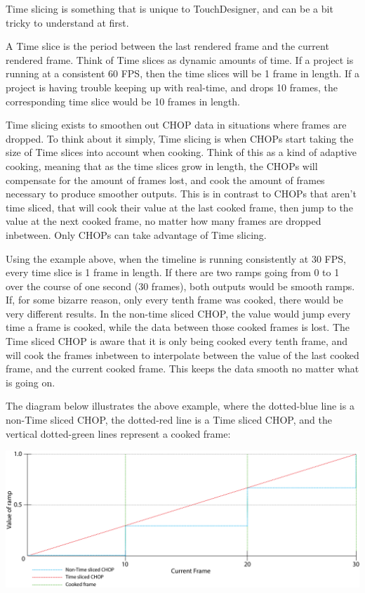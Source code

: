 \begin{fullwidth}

Time slicing is something that is unique to TouchDesigner, and can be a bit tricky to understand at first. 

A Time slice is the period between the last rendered frame and the current rendered frame. Think of Time slices as dynamic amounts of time. If a project is running at a consistent 60 FPS, then the time slices will be 1 frame in length. If a project is having trouble keeping up with real-time, and drops 10 frames, the corresponding time slice would be 10 frames in length.

Time slicing exists to smoothen out CHOP data in situations where frames are dropped. To think about it simply, Time slicing is when CHOPs start taking the size of Time slices into account when cooking. Think of this as a kind of adaptive cooking, meaning that as the time slices grow in length, the CHOPs will compensate for the amount of frames lost, and cook the amount of frames necessary to produce smoother outputs. This is in contrast to CHOPs that aren't time sliced, that will cook their value at the last cooked frame, then jump to the value at the next cooked frame, no matter how many frames are dropped inbetween. Only CHOPs can take advantage of Time slicing.

Using the example above, when the timeline is running consistently at 30 FPS, every time slice is 1 frame in length. If there are two ramps going from 0 to 1 over the course of one second (30 frames), both outputs would be smooth ramps. If, for some bizarre reason, only every tenth frame was cooked, there would be very different results. In the non-time sliced CHOP, the value would jump every time a frame is cooked, while the data between those cooked frames is lost. The Time sliced CHOP is aware that it is only being cooked every tenth frame, and will cook the frames inbetween to interpolate between the value of the last cooked frame, and the current cooked frame. This keeps the data smooth no matter what is going on. 

The diagram below illustrates the above example, where the dotted-blue line is a non-Time sliced CHOP, the dotted-red line is a Time sliced CHOP, and the vertical dotted-green lines represent a cooked frame: 

\begin{center}
\includegraphics[width=14cm]{./img/4.4/Timeslice.png}
\end{center}

\end{fullwidth}
